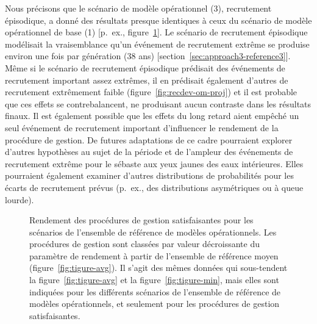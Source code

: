 \documentclass[french,11pt]{book}
\begin{document}
Nous précisons que le scénario de modèle opérationnel (3), recrutement épisodique, a donné des résultats presque identiques à ceux du scénario de modèle opérationnel de base (1) {[}p.~ex., figure~\ref{fig:tigure-panel}{]}. Le scénario de recrutement épisodique modélisait la vraisemblance qu'un événement de recrutement extrême se produise environ une fois par génération (38 ans) {[}section~\ref{sec:approach3-reference3}{]}. Même si le scénario de recrutement épisodique prédisait des événements de recrutement important assez extrêmes, il en prédisait également d'autres de recrutement extrêmement faible (figure~\ref{fig:recdev-om-proj}) et il est probable que ces effets se contrebalancent, ne produisant aucun contraste dans les résultats finaux. Il est également possible que les effets du long retard aient empêché un seul événement de recrutement important d'influencer le rendement de la procédure de gestion. De futures adaptations de ce cadre pourraient explorer d'autres hypothèses au sujet de la période et de l'ampleur des événements de recrutement extrême pour le sébaste aux yeux jaunes des eaux intérieures. Elles pourraient également examiner d'autres distributions de probabilités pour les écarts de recrutement prévus (p.~ex., des distributions asymétriques ou à queue lourde).


\begin{figure}[htb]

{\centering {} 

}

\caption{Rendement des procédures de gestion satisfaisantes pour les scénarios de l'ensemble de référence de modèles opérationnels. Les procédures de gestion sont classées par valeur décroissante du paramètre de rendement à partir de l'ensemble de référence moyen (figure~\ref{fig:tigure-avg}). Il s'agit des mêmes données qui sous-tendent la figure~\ref{fig:tigure-avg} et la figure~\ref{fig:tigure-min}, mais elles sont indiquées pour les différents scénarios de l'ensemble de référence de modèles opérationnels, et seulement pour les procédures de gestion satisfaisantes.}\label{fig:tigure-panel}
\end{figure}
\clearpage
\end{document}
